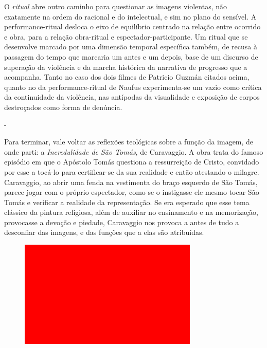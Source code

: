 O \emph{ritual} abre outro caminho para questionar as imagens violentas,
não exatamente na ordem do racional e do intelectual, e sim no plano do
sensível. A performance-ritual desloca o eixo de equilíbrio centrado na
relação entre ocorrido e obra, para a relação obra-ritual e
espectador-participante. Um ritual que se desenvolve marcado por uma
dimensão temporal específica também, de recusa à passagem do tempo que
marcaria um antes e um depois, base de um discurso de superação da
violência e da marcha histórica da narrativa de progresso que a
acompanha. Tanto no caso dos dois filmes de Patricio Guzmán citados
acima, quanto no da performance-ritual de Naufus experimenta-se um vazio
como crítica da continuidade da violência, nas antípodas da visualidade
e exposição de corpos destroçados como forma de denúncia.

-

Para terminar, vale voltar as reflexões teológicas sobre a função da
imagem, de onde parti: a \emph{Incredulidade de São Tomás}, de
Caravaggio. A obra trata do famoso episódio em que o Apóstolo Tomás
questiona a ressurreição de Cristo, convidado por esse a tocá-lo para
certificar-se da sua realidade e então atestando o milagre. Caravaggio,
ao abrir uma fenda na vestimenta do braço esquerdo de São Tomás, parece
jogar com o próprio espectador, como se o instigasse ele mesmo tocar São
Tomás e verificar a realidade da representação. Se era esperado que esse
tema clássico da pintura religiosa, além de auxiliar no ensinamento e na
memorização, provocasse a devoção e piedade, Caravaggio nos provoca a
antes de tudo a desconfiar das imagens, e das funções que a elas são
atribuídas.

\begin{figure}[!ht]
\centering
 \includegraphics[width=85mm]{./imgs/im1.jpg}
\caption{\footnotesize{}}
\end{figure}

